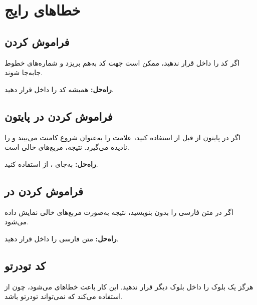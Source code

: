 
\section{خطاهای رایج}
\label{sec:code-mistakes}

\subsection{فراموش کردن }
\label{sec:code-mistake-latin}

اگر کد را داخل  قرار ندهید، ممکن
است جهت کد به‌هم بریزد و شماره‌های خطوط
جابه‌جا شوند.

\textbf{راه‌حل:} همیشه کد را داخل
قرار دهید.

\subsection{فراموش کردن  در پایتون}
\label{sec:code-mistake-pcc}

اگر در پایتون از \lr{\#} قبل از  استفاده
کنید،  علامت \lr{\#} را به‌عنوان
شروع کامنت می‌بیند و \lr{|} را نادیده می‌گیرد.
نتیجه، مربع‌های خالی است.

\textbf{راه‌حل:} به‌جای ،
از  استفاده کنید.

\subsection{فراموش کردن  در }
\label{sec:code-mistake-pc}

اگر در  متن فارسی را بدون 
بنویسید، نتیجه به‌صورت مربع‌های خالی نمایش
داده می‌شود.

\textbf{راه‌حل:} متن فارسی را داخل 
قرار دهید.

\subsection{کد تودرتو }
\label{sec:code-mistake-nested}

هرگز یک بلوک  را داخل بلوک
 دیگر قرار ندهید. این کار باعث
خطاهای 
می‌شود، چون  از 
استفاده می‌کند که نمی‌تواند تودرتو باشد.


